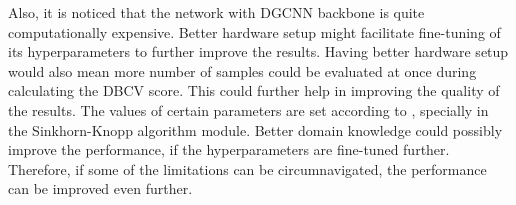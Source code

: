 \vspace{5mm}

Also, it is noticed that the network with \ac{DGCNN} backbone is quite 
computationally expensive. Better hardware setup might facilitate fine-tuning of its hyperparameters to further improve the results. Having better hardware setup would also mean more number of samples could be evaluated at once during calculating the \ac{DBCV} score. This could further help in improving the quality of the results. The values of certain parameters are set according to \cite{mei2022unsupervised}, specially in the  Sinkhorn-Knopp algorithm module. Better domain knowledge could possibly improve the performance, if the hyperparameters are fine-tuned further. Therefore, if some of the limitations can be circumnavigated, the performance can be improved even further.